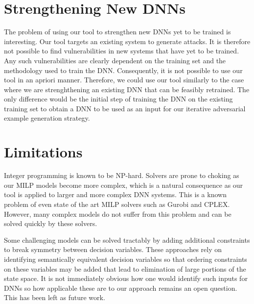 \section{Strengthening New DNNs}
The problem of using our tool to strengthen new DNNs yet to be trained is interesting. Our tool targets an existing system to generate attacks. It is therefore not possible
to find vulnerabilities in new systems that have yet to be trained. Any such vulnerabilities are clearly dependent on the training set and the methodology used to train the DNN.
Consequently, it is not possible to use our tool in an apriori manner. Therefore, we could use our tool similarly to the case where we are strenghthening an existing DNN that can be feasibly retrained.
The only difference would be the initial step of training the DNN on the existing training set to obtain a DNN to be used as an input for our iterative adversarial example generation strategy.

\section{Limitations}
Integer programming is known to be NP-hard. Solvers are prone to choking as our MILP models become more complex, which is a natural consequence as our tool is applied to larger and more complex DNN systems.
This is a known problem of even state of the art MILP solvers such as Gurobi and CPLEX. However, many complex models do not suffer from this problem and can be solved quickly by these solvers.

Some challenging models can be solved tractably by adding additional constraints to break symmetry between decision variables.
These approaches rely on identifying semantically equivalent decision variables so that ordering constraints on these variables may be added
that lead to elimination of large portions of the state space. It is not immediately obvious how one would identify such inputs for DNNs so how
applicable these are to our approach remains an open question. This has been left as future work.


